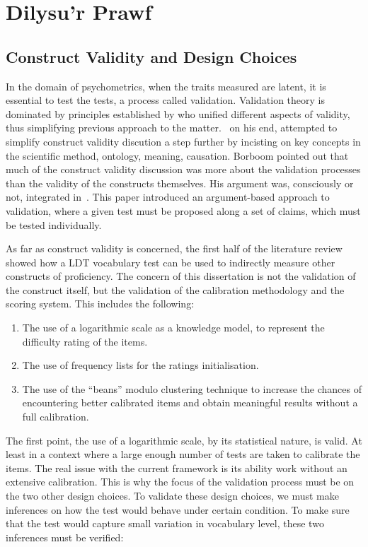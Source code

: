 \section{Dilysu'r Prawf}
\subsection{Construct Validity and Design Choices}
In the domain of psychometrics, when the traits measured are latent, it is essential to test the tests, a process called validation. Validation theory is dominated by principles established by \textcite{messick_validity_1987} who unified different aspects of validity, thus simplifying previous approach to the matter.\ \textcite{borsboom_concept_2004} on his end, attempted to simplify construct validity discution a step further by incisting on key concepts in the scientific method, ontology, meaning, causation. Borboom pointed out that much of the construct validity discussion was more about the validation processes than the validity of the constructs themselves. His argument was, consciously or not, integrated in~\cite{kane_validating_2013}. This paper introduced an argument-based approach to validation, where a given test must be proposed along a set of claims, which must be tested individually.

As far as construct validity is concerned, the first half of the literature review showed how a LDT vocabulary test can be used to indirectly measure other constructs of proficiency. The concern of this dissertation is not the validation of the construct itself, but the validation of the calibration methodology and the scoring system. This includes the following:

\begin{enumerate}
  \item The use of a logarithmic scale as a knowledge model, to represent the difficulty rating of the items.
  \item The use of frequency lists for the ratings initialisation.
  \item The use of the ``beans'' modulo clustering technique to increase the chances of encountering better calibrated items and obtain meaningful results without a full calibration.
\end{enumerate}

The first point, the use of a logarithmic scale, by its statistical nature, is valid. At least in a context where a large enough number of tests are taken to calibrate the items. The real issue with the current framework is its ability work without an extensive calibration. This is why the focus of the validation process must be on the two other design choices. To validate these design choices, we must make inferences on how the test would behave under certain condition. To make sure that the test would capture small variation in vocabulary level, these two inferences must be verified:

